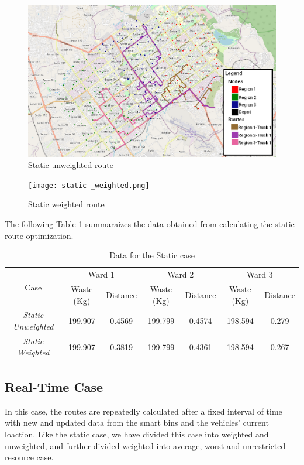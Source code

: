 \documentclass[12pt]{article}
\begin{document}
\begin{figure}[h]
    \centering
    \includegraphics[scale=0.4]{static_unweighted.png}
    \caption{Static unweighted route}\label{fig3}
\end{figure}
\begin{figure}[h]
    \centering
    \texttt{[image: static \_weighted.png]}
    \caption{Static weighted route}\label{fig4}
\end{figure}
The following Table \ref{tab1} summaraizes the data obtained from calculating the static route optimization.
\begin{table}[H]
    \centering
    \caption{Data for the Static case} \label{tab1}
    \vspace*{0.3cm}
    \begin{tabular}{|c|c|c|c|c|c|c|}
        \hline \multirow{2}{*}{Case} & \multicolumn{2}{c|}{Ward 1} & \multicolumn{2}{c|}{Ward 2} & \multicolumn{2}{c|}{Ward 3}\\
        \cline{2-7}& Waste (Kg) & Distance & Waste (Kg) & Distance & Waste (Kg) & Distance\\ 
        \hline \textit{Static Unweighted} & 199.907 & 0.4569 & 199.799 & 0.4574 & 198.594 & 0.279 \\
        \hline \textit{Static Weighted} & 199.907 & 0.3819 & 199.799 & 0.4361 & 198.594 & 0.267 \\
        \hline
    \end{tabular}
\end{table}

\subsection*{Real-Time Case}
In this case, the routes are repeatedly calculated after a fixed interval of time with new and updated data from the smart bins and the vehicles' current loaction. Like the static case, we have divided this case into weighted and unweighted, and further divided weighted into average, worst and unrestricted resource case. 
\end{document}
